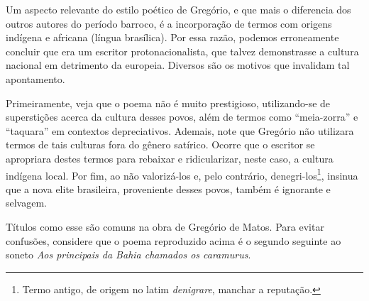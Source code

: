 \documentclass[12pt]{book}
\begin{document}
		\par Um aspecto relevante do estilo poético de Gregório, e que mais o diferencia dos outros autores do período barroco, é a incorporação de termos com origens indígena e africana (língua brasílica). Por essa razão, podemos erroneamente concluir que era um escritor protonacionalista, que talvez demonstrasse a cultura nacional em detrimento da europeia. Diversos são os motivos que invalidam tal apontamento.
		\par Primeiramente, veja que o poema não é muito prestigioso, utilizando-se de superstições acerca da cultura desses povos, além de termos como ``meia-zorra'' e ``taquara'' em contextos depreciativos. Ademais, note que Gregório não utilizara termos de tais culturas fora do gênero satírico. Ocorre que o escritor se apropriara destes termos para rebaixar e ridicularizar, neste caso, a cultura indígena local. Por fim, ao não valorizá-los e, pelo contrário, denegri-los\footnote{Termo antigo, de origem no latim \textit{denigrare}, manchar a reputação.}, insinua que a nova elite brasileira, proveniente desses povos, também é ignorante e selvagem.
		\par Títulos como esse são comuns na obra de Gregório de Matos. Para evitar confusões, considere que o poema reproduzido acima é o segundo seguinte ao soneto \textit{Aos principais da Bahia chamados os caramurus}.
		\settowidth{\versewidth}{encontrei Quatimondé}
\end{document}
